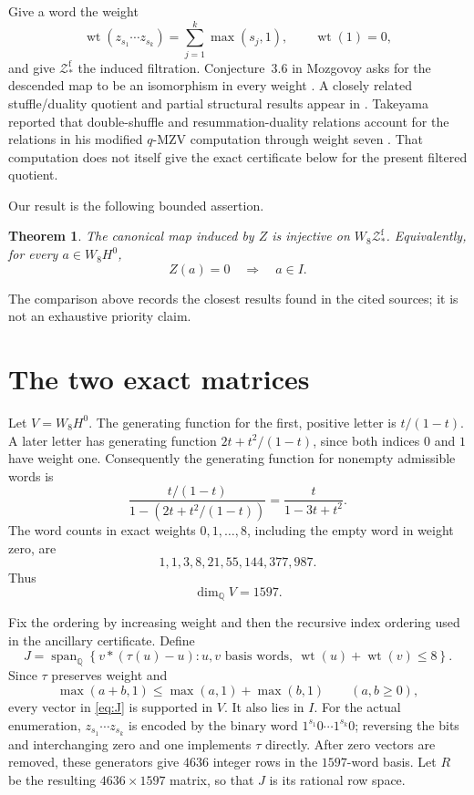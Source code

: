 \documentclass[11pt]{article}
\newtheorem{theorem}{Theorem}
\newcommand{\Q}{\mathbb{Q}}
\newcommand{\Zf}{\mathcal{Z}^{\mathrm f}_*}
\begin{document}
Give a word the weight
\[
 \operatorname{wt}(z_{s_1}\cdots z_{s_k})
   =\sum_{j=1}^k\max(s_j,1),\qquad \operatorname{wt}(1)=0,
\]
and give \(\Zf\) the induced filtration.  Conjecture~3.6 in Mozgovoy asks for
the descended map to be an isomorphism in every weight
\cite{Mozgovoy2026}.  A closely related stuffle/duality quotient and partial
structural results appear in \cite{Brindle2025}.  Takeyama reported that
double-shuffle and resummation-duality relations account for the relations in
his modified \(q\)-MZV computation through weight seven
\cite[p.~2]{Takeyama2013}.  That computation does not itself give the exact
certificate below for the present filtered quotient.

Our result is the following bounded assertion.

\begin{theorem}\label{thm:main}
The canonical map induced by \(Z\) is injective on \(W_8\Zf\).  Equivalently,
for every \(a\in W_8H^0\),
\[
 Z(a)=0\quad\Longrightarrow\quad a\in I.
\]
\end{theorem}

The comparison above records the closest results found in the cited sources;
it is not an exhaustive priority claim.

\section{The two exact matrices}

Let \(V=W_8H^0\).  The generating function for the first, positive letter is
\(t/(1-t)\).  A later letter has generating function
\(2t+t^2/(1-t)\), since both indices \(0\) and \(1\) have weight one.
Consequently the generating function for nonempty admissible words is
\[
 \frac{t/(1-t)}{1-(2t+t^2/(1-t))}
 =\frac{t}{1-3t+t^2}.
\]
The word counts in exact weights \(0,1,\ldots,8\), including the empty word
in weight zero, are
\[
 1,1,3,8,21,55,144,377,987.
\]
Thus
\begin{equation}\label{eq:dim}
 \dim_{\Q}V=1597.
\end{equation}

Fix the ordering by increasing weight and then the recursive index ordering
used in the ancillary certificate.  Define
\begin{equation}\label{eq:J}
 J=\operatorname{span}_{\Q}
 \left\{v*(\tau(u)-u):
 u,v\text{ basis words},\ 
 \operatorname{wt}(u)+\operatorname{wt}(v)\leq8\right\}.
\end{equation}
Since \(\tau\) preserves weight and
\[
 \max(a+b,1)\leq\max(a,1)+\max(b,1)
 \qquad(a,b\geq0),
\]
every vector in \eqref{eq:J} is supported in \(V\).  It also lies in \(I\).
For the actual enumeration, \(z_{s_1}\cdots z_{s_k}\) is encoded by the
binary word \(1^{s_1}0\cdots1^{s_k}0\); reversing the bits and interchanging
zero and one implements \(\tau\) directly.
After zero vectors are removed, these generators give \(4636\) integer rows
in the \(1597\)-word basis.  Let \(R\) be the resulting
\(4636\times1597\) matrix, so that \(J\) is its rational row space.
\end{document}
